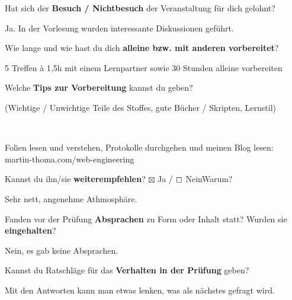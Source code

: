 \documentclass[a4paper]{article}
\begin{document}
 \begin{multicols}{2}

   Hat sich der \textbf{Besuch / Nichtbesuch} der Veranstaltung für dich gelohnt? \\
  \begin{minipage}[t][6.8cm]{\linewidth}
    Ja. In der Vorlesung wurden interessante Diskussionen geführt.

  \end{minipage}

   Wie lange und wie hast du dich \textbf{alleine bzw. mit anderen vorbereitet}? \\ 
  \begin{minipage}[t][7cm]{\linewidth}
    5 Treffen à 1,5h mit einem Lernpartner sowie 30 Stunden alleine vorbereiten

  \end{minipage}

   Welche \textbf{Tips zur Vorbereitung} kannst du geben?
  \begin{footnotesize}(Wichtige / Unwichtige Teile des Stoffes, gute Bücher / Skripten, Lernstil)\end{footnotesize} \\
  \begin{minipage}[t][7cm]{\linewidth}
    Folien lesen und verstehen, Protokolle durchgehen und
    meinen Blog lesen:\\
    martin-thoma.com/web-engineering
  \end{minipage}

\columnbreak

   Kannst du ihn/sie \textbf{weiterempfehlen}? 
  $\boxtimes$ Ja / $\boxempty$ Nein\newline Warum? \\
  \begin{minipage}[t][6.8cm]{\linewidth}
    Sehr nett, angenehme Athmosphäre.

  \end{minipage}

   Fanden vor der Prüfung \textbf{Absprachen} zu Form oder Inhalt statt? Wurden sie \textbf{eingehalten}? \\
  \begin{minipage}[t][7cm]{\linewidth}
    Nein, es gab keine Absprachen.

  \end{minipage}

   Kannst du Ratschläge für das \textbf{Verhalten in der Prüfung} geben? \\
  \begin{minipage}[t][6.8cm]{\linewidth}
    Mit den Antworten kann man etwas lenken, was als nächstes 
    gefragt wird.

  \end{minipage}
% 
\end{multicols}
\clearpage 
\end{document}
